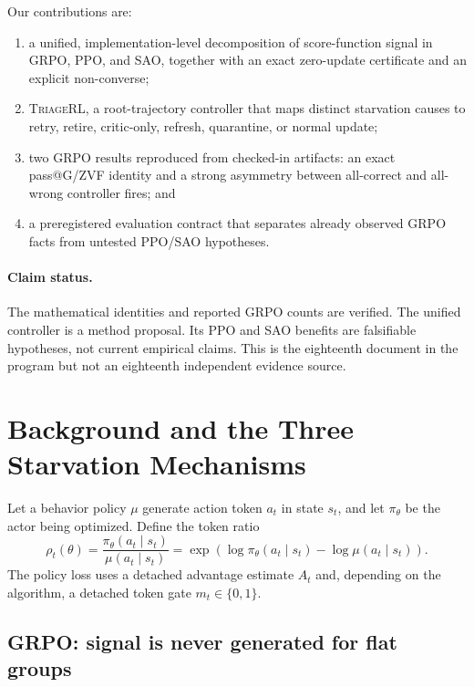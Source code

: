 \documentclass{article}
\newcommand{\method}{\textsc{TriageRL}\xspace}
\begin{document}
Our contributions are:
\begin{enumerate}[leftmargin=*,itemsep=2pt]
  \item a unified, implementation-level decomposition of score-function
  signal in GRPO, PPO, and SAO, together with an exact zero-update certificate
  and an explicit non-converse;
  \item \method, a root-trajectory controller that maps distinct starvation
  causes to retry, retire, critic-only, refresh, quarantine, or normal update;
  \item two GRPO results reproduced from checked-in artifacts: an exact
  pass@G/ZVF identity and a strong asymmetry between all-correct and all-wrong
  controller fires; and
  \item a preregistered evaluation contract that separates already observed
  GRPO facts from untested PPO/SAO hypotheses.
\end{enumerate}

\paragraph{Claim status.}
The mathematical identities and reported GRPO counts are verified.  The
unified controller is a method proposal.  Its PPO and SAO benefits are
falsifiable hypotheses, not current empirical claims. This is the eighteenth
document in the program but not an eighteenth independent evidence source.

\section{Background and the Three Starvation Mechanisms}
\label{sec:background}

Let a behavior policy $\mu$ generate action token $a_t$ in state $s_t$, and
let $\pi_\theta$ be the actor being optimized.  Define the token ratio
\begin{equation}
  \rho_t(\theta)=
  \frac{\pi_\theta(a_t\mid s_t)}{\mu(a_t\mid s_t)}
  =\exp\!\left(\log\pi_\theta(a_t\mid s_t)
        -\log\mu(a_t\mid s_t)\right).
  \label{eq:ratio}
\end{equation}
The policy loss uses a detached advantage estimate $A_t$ and, depending on
the algorithm, a detached token gate $m_t\in\{0,1\}$.

\subsection{GRPO: signal is never generated for flat groups}
\end{document}
